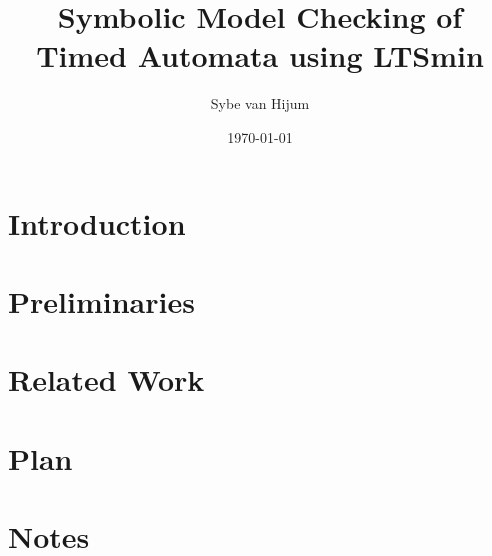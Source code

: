 \documentclass[11pt,a4paper]{article}
\newcommand{\ltsmin}{LTSmin}
\begin{document}
\newtheorem{mydef}{Definition}
\title{Symbolic Model Checking of Timed Automata using \ltsmin{}}
\author{Sybe van Hijum}
\date{\today{}}
\maketitle

\clearpage
\tableofcontents

\clearpage
\section{Introduction}


%

\clearpage
\section{Preliminaries}


\clearpage
\section{Related Work}


\clearpage
\section{Plan}


\clearpage
\section{Notes}


\clearpage
{}

\end{document}
